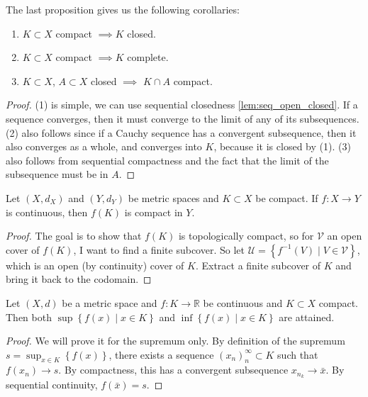 \begin{corollary}\label{cor:compactness}
	The last proposition gives us the following corollaries:
	\begin{enumerate}
		\item $K \subset X$ compact $\implies K$ closed.
		\item $K \subset X$ compact $\implies K$ complete.
		\item $K \subset X$, $A \subset X$ closed $\implies$ $K \cap A$ compact.
	\end{enumerate}
\end{corollary}
\begin{proof}
	(1) is simple, we can use sequential closedness \ref{lem:seq_open_closed}. If a sequence converges, then it must converge to the limit of any of its subsequences. (2) also follows since if a Cauchy sequence has a convergent subsequence, then it also converges as a whole, and converges into $K$, because it is closed by (1). (3) also follows from sequential compactness and the fact that the limit of the subsequence must be in $A$.
\end{proof}

\begin{prop}\label{prop:contin_image_of_compact}
	Let $(X, d_{X})$ and $(Y, d_{Y})$ be metric spaces and $K \subset X$ be compact. If $f: X \to Y$ is continuous, then $f(K)$ is compact in $Y$.
\end{prop}
\begin{proof}
	The goal is to show that $f(K)$ is topologically compact, so for $\mathcal{V}$ an open cover of $f(K)$, I want to find a finite subcover. So let $\mathcal{U} = \left\{ f^{-1}(V) \mid V \in \mathcal{V} \right\}$, which is an open (by continuity) cover of $K$. Extract a finite subcover of $K$ and bring it back to the codomain.
\end{proof}

\begin{theorem}\label{thm:extreme_val_theorem}
	Let $(X,d)$ be a metric space and $f:K \to \mathbb{R}$ be continuous and $K \subset X$ compact. Then both $\sup\left\{ f(x) \mid x \in K \right\}$ and $\inf\left\{ f(x) \mid x \in K \right\}$ are attained.
\end{theorem}
\begin{proof}
	We will prove it for the supremum only. By definition of the supremum $s = \sup_{x \in K} \left\{ f(x) \right\}$, there exists a sequence $(x_{n})_{n}^{\infty} \subset K$ such that $f(x_{n}) \to s$. By compactness, this has a convergent subsequence $x_{n_{k}} \to \bar{x}$. By sequential continuity, $f(\bar{x}) = s$.
\end{proof}

